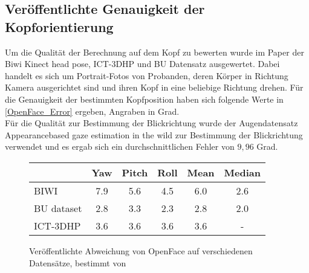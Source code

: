 \subsection{Veröffentlichte Genauigkeit der Kopforientierung}
Um die Qualität der Berechnung auf dem Kopf zu bewerten wurde im Paper \cite{OpenFace} der \glqq Biwi Kinect head pose\grqq \cite{BIWI_database}, \glqq ICT-3DHP\grqq \cite{ICT_database} und \glqq BU Datensatz\grqq \cite{BU_database} ausgewertet. Dabei handelt es sich um Portrait-Fotos von Probanden, deren Körper in Richtung Kamera ausgerichtet sind und ihren Kopf in eine beliebige Richtung drehen. Für die Genauigkeit der bestimmten Kopfposition haben sich folgende Werte in \autoref{OpenFace_Error} ergeben, Angraben in Grad.\\
Für die Qualität zur Bestimmung der Blickrichtung wurde der Augendatensatz \glqq Appearancebased gaze estimation in the wild\grqq \cite{database_Eye_old} zur Bestimmung der Blickrichtung verwendet und es ergab sich ein durchschnittlichen Fehler von $9,96$ Grad.
\begin{figure}[h]
	\centering
	\begin{tabular}{|l|c|c|c||c|c|}
		\hline
		&Yaw&Pitch&Roll&Mean&Median\\\hline
		BIWI&7.9&5.6&4.5&6.0&2.6\\\hline
		BU dataset&2.8&3.3&2.3&2.8&2.0\\\hline
		ICT-3DHP&3.6&3.6&3.6&3.6&-\\\hline
	\end{tabular}
	\caption{Veröffentlichte Abweichung von OpenFace auf verschiedenen Datensätze, bestimmt von \cite{OpenFace}}
	\label{OpenFace_Error}
\end{figure}